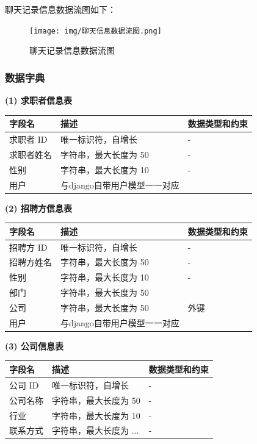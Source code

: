 \documentclass[UTF8,a4paper,10pt]{ctexart}
\begin{document}
聊天记录信息数据流图如下：

\begin{figure}[H]
    \centering
    \texttt{[image: img/聊天信息数据流图.png]}
    \caption{聊天记录信息数据流图}
    \label{fig:聊天信息数据流图}
\end{figure}

\subsubsection{数据字典}

\textbf{(1) 求职者信息表}\\
\begin{center}
\begin{tabular}{|l|l|l|}
\hline
\textbf{字段名} & \textbf{描述} & \textbf{数据类型和约束} \\
\hline
求职者 ID & 唯一标识符，自增长 & - \\\hline
求职者姓名 & 字符串，最大长度为 50 & - \\\hline
性别 & 字符串，最大长度为 10 & - \\
\hline
 用户& 与django自带用户模型一一对应&\\\hline
\end{tabular}
\end{center}

\textbf{(2) 招聘方信息表}\\
\begin{center}
\begin{tabular}{|l|l|l|}
\hline
字段名 & 描述 & 数据类型和约束 \\
\hline
招聘方 ID & 唯一标识符，自增长 & - \\\hline
招聘方姓名 & 字符串，最大长度为 50 & - \\\hline
性别 & 字符串，最大长度为 10 & - \\
\hline
 部门& 字符串，最大长度为 50&\\\hline
 公司& 字符串，最大长度为 50&外键\\\hline
 用户& 与django自带用户模型一一对应&\\\hline
\end{tabular}
\end{center}

\textbf{(3) 公司信息表}\\
\begin{center}
\begin{tabular}{|l|l|l|}
\hline
字段名 & 描述 & 数据类型和约束 \\
\hline
公司 ID& 唯一标识符，自增长 & - \\\hline
公司名称& 字符串，最大长度为 50 & - \\\hline
行业& 字符串，最大长度为 10 & - \\\hline
联系方式 & 字符串，最大长度为 ... & - \\
\hline
\end{tabular}
\end{center}
\end{document}
